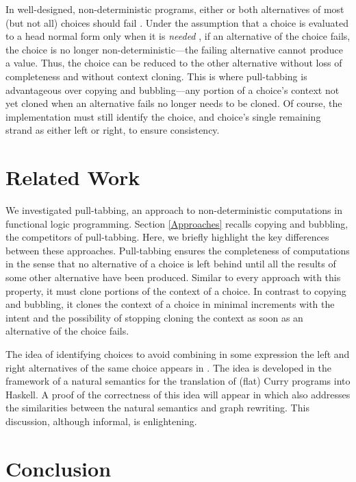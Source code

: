 \documentclass{mytlp}
\begin{document}
In well-designed, non-deterministic programs,
either or both alternatives of most (but not all) choices
should fail \cite{Antoy10JSC}.
Under the assumption that a choice is evaluated to a head normal form
only when it is \emph{needed} \cite{Antoy97ALP},
if an alternative of the choice fails,
the choice is no longer non-deterministic---the
failing alternative cannot produce a value.
Thus, the choice can be reduced to the other alternative
without loss of completeness and without context cloning.
This is where pull-tabbing is advantageous over
copying and bubbling---any portion of a choice's context not yet cloned
when an alternative fails no longer needs to be cloned.
Of course, the implementation must still identify the choice,
and choice's single remaining strand as either left or right, 
to ensure consistency.

\section{Related Work}

We investigated pull-tabbing, an approach to
non-deterministic computations in functional logic programming.
Section \ref{Approaches} recalls copying and bubbling,
the competitors of pull-tabbing.
Here, we briefly highlight the key differences between these approaches.
Pull-tabbing ensures the completeness of computations
in the sense that no alternative of a choice is left behind
until all the results of some other alternative have been produced.
Similar to every approach with this property, it must clone
portions of the context of a choice.
In contrast to copying and bubbling, it clones
the context of a choice in minimal increments
with the intent and the possibility of stopping cloning
the context as soon as an alternative of the choice fails.

The idea of identifying choices to avoid combining in some
expression the left and right alternatives of the same choice
appears in \cite{BrasselHuchAPLAS07}. The idea is developed
in the framework of a natural semantics for the translation
of (flat) Curry programs into Haskell.
A proof of the correctness of this idea will appear in
\cite{Brassel2011PhD} which also addresses the similarities
between the natural semantics and graph rewriting.  
This discussion, although informal, is enlightening.

\section{Conclusion}
\end{document}
